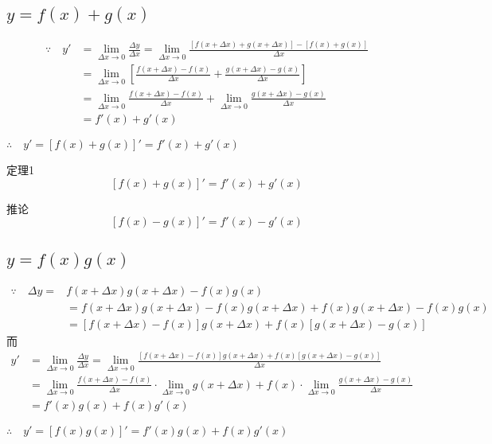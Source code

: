 \subsection{$y=f(x)+g(x)$}
\[\begin{split}
    \because\quad y' &=\lim_{\Delta x\to0}\frac{\Delta y}{\Delta x}=\lim_{\Delta x\to0}\frac{\left[f(x+\Delta x)+g(x+\Delta x)\right]-\left[f(x)+g(x)\right]}{\Delta x}\\
    &=\lim_{\Delta x\to0}\left[\frac{f(x+\Delta x)-f(x)}{\Delta x}+\frac{g(x+\Delta x)-g(x)}{\Delta x}\right]\\
    &=\lim_{\Delta x\to0}\frac{f(x+\Delta x)-f(x)}{\Delta x}+\lim_{\Delta x\to0}\frac{g(x+\Delta x)-g(x)}{\Delta x}\\
    &=f' (x)+g' (x)
\end{split}\]

$\therefore\quad y' =[f(x)+g(x)]' =f' (x)+g' (x)$

\begin{thm}{定理1}
\[[f(x)+g(x)]' =f' (x)+g' (x)\]
\end{thm}

\begin{thm}{推论}
\[[f(x)-g(x)]' =f' (x)-g' (x)\]
\end{thm}

\subsection{ $y=f(x)g(x)$}
\[\begin{split}
\because\quad \Delta y=&f(x+\Delta x)g(x+\Delta x)-f(x)g(x)\\
&=f(x+\Delta x)g(x+\Delta x)-f(x)g(x+\Delta x)+f(x)g(x+\Delta x)-f(x)g(x)\\
&=[f(x+\Delta x)-f(x)]g(x+\Delta x) +f(x)[g(x+\Delta x)-g(x)]
\end{split}\]
而
\[\begin{split}
    y' &=\lim_{\Delta x\to0}\frac{\Delta y}{\Delta x}=\lim_{\Delta x\to0}\frac{\left[f(x+\Delta x)-f(x)\right]g(x+\Delta x)+f(x)\left[g(x+\Delta x)-g(x)\right]}{\Delta x}\\
    &=\lim_{\Delta x\to0}\frac{f(x+\Delta x)-f(x)}{\Delta x}\cdot\lim_{\Delta x\to0}g(x+\Delta x)+f(x)\cdot\lim_{\Delta x\to0}\frac{g(x+\Delta x)-g(x)}{\Delta x}\\
    &=f' (x)g(x)+f(x)g' (x)
\end{split}\]

$\therefore\quad y' =[f(x)g(x)]' =f' (x)g(x)+f(x)g' (x)$

